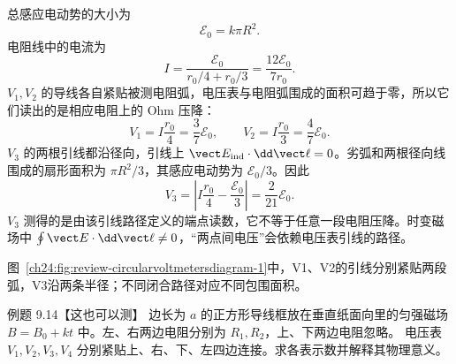 \begin{xesolution}
总感应电动势的大小为
\begin{equation}
  \mathcal E_0=k\pi R^2.
\end{equation}
电阻线中的电流为
\begin{equation}
  I=\frac{\mathcal E_0}{r_0/4+r_0/3}
  =\frac{12\mathcal E_0}{7r_0}.
\end{equation}
$V_1,V_2$ 的导线各自紧贴被测电阻弧，电压表与电阻弧围成的面积可趋于零，所以它们读出的是相应电阻上的 Ohm 压降：
\begin{equation}
  \boxed{V_1=I\frac{r_0}{4}=\frac37\mathcal E_0},
  \qquad
  \boxed{V_2=I\frac{r_0}{3}=\frac47\mathcal E_0}.
\end{equation}
$V_3$ 的两根引线都沿径向，引线上 $\vect E_{\rm ind}\cdot\dd\vect\ell=0$。劣弧和两根径向线围成的扇形面积为 $\pi R^2/3$，其感应电动势为 $\mathcal E_0/3$。因此
\begin{equation}
  \boxed{V_3=\left|I\frac{r_0}{4}-\frac{\mathcal E_0}{3}\right|
  =\frac{2}{21}\mathcal E_0}.
\end{equation}
$V_3$ 测得的是由该引线路径定义的端点读数，它不等于任意一段电阻压降。时变磁场中 $\oint\vect E\cdot\dd\vect\ell\ne0$，“两点间电压”会依赖电压表引线的路径。

图~\ref{ch24:fig:review-circularvoltmetersdiagram-1}中，V1、V2的引线分别紧贴两段弧，V3沿两条半径；不同闭合路径对应不同包围面积。

\end{xesolution}

\begin{origexamplebox}{例题 9.14【这也可以测】}
边长为 $a$ 的正方形导线框放在垂直纸面向里的匀强磁场 $B=B_0+kt$ 中。左、右两边电阻分别为 $R_1,R_2$，上、下两边电阻忽略。
电压表 $V_1,V_2,V_3,V_4$ 分别紧贴上、右、下、左四边连接。求各表示数并解释其物理意义。
\par\noindent\begin{minipage}{\linewidth}
\squareVoltmetersDiagram
{}\label{ch24:fig:review-squarevoltmetersdiagram-1}
\end{minipage}\par\medskip
\end{origexamplebox}

